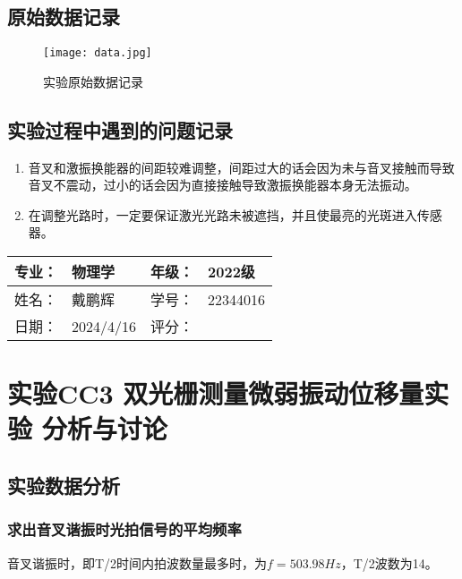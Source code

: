 \documentclass[dvipsnames, svgnames,a4paper,11pt]{article}
\begin{document}
\subsection{原始数据记录}

	\begin{figure}[htbp]
		\centering
		\texttt{[image: data.jpg]}
		\caption{实验原始数据记录}
	\end{figure}



\subsection{实验过程中遇到的问题记录}

\begin{enumerate}
	\item 音叉和激振换能器的间距较难调整，间距过大的话会因为未与音叉接触而导致音叉不震动，过小的话会因为直接接触导致激振换能器本身无法振动。
	\item 在调整光路时，一定要保证激光光路未被遮挡，并且使最亮的光斑进入传感器。
	
\end{enumerate}
	

\clearpage
\begin{table}
	\renewcommand\arraystretch{1.7}
	\begin{tabularx}{\textwidth}{|X|X|X|X|}
	\hline
	专业：& 物理学 &年级：& 2022级\\
	\hline
	姓名： & 戴鹏辉 & 学号：& 22344016\\
	\hline
    日期：& 2024/4/16 & 评分： &\\
	\hline
	\end{tabularx}
\end{table}

\section{实验CC3 \quad 双光栅测量微弱振动位移量实验 \quad\heiti 分析与讨论}

\subsection{实验数据分析}

	\subsubsection{求出音叉谐振时光拍信号的平均频率}

	音叉谐振时，即T/2时间内拍波数量最多时，为$f=503.98Hz$，T/2波数为14。
\end{document}
